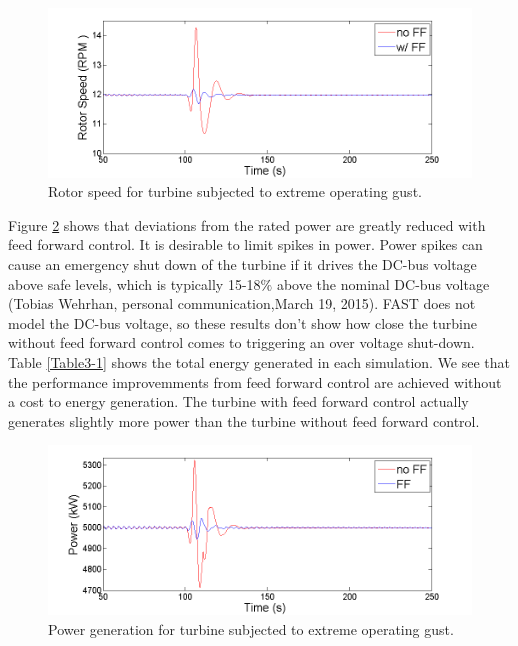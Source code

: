 \begin{figure}[htbp]
	\centering
		\includegraphics[trim = {1cm 0 2cm 0}, clip, width = \linewidth]{Figures/ch3Figures/fig3-14.png}
		
	\caption{Rotor speed for turbine subjected to extreme operating gust. }
	\label{fig3-14}
\end{figure}

Figure \ref{fig3-15} shows that deviations from the rated power are greatly reduced with feed forward control. It is desirable to limit spikes in power. Power spikes can cause an emergency shut down of the turbine if it drives the DC-bus voltage above safe levels, which is typically 15-18$\%$ above the nominal DC-bus voltage (Tobias Wehrhan, personal communication,March 19, 2015). FAST does not model the DC-bus voltage, so these results don't show how close the turbine without feed forward control comes to triggering an over voltage shut-down. Table \ref{Table3-1} shows the total energy generated in each simulation. We see that the performance improvemments from feed forward control are achieved without a cost to energy generation. The turbine with feed forward control actually generates slightly more power than the turbine without feed forward control.


\begin{figure}[htbp]
	\centering
		\includegraphics[trim = {1cm 0 2cm 0}, clip, width = \linewidth]{Figures/ch3Figures/fig3-15.png}
		
	\caption{Power generation for turbine subjected to extreme operating gust.}
	\label{fig3-15}
\end{figure}

